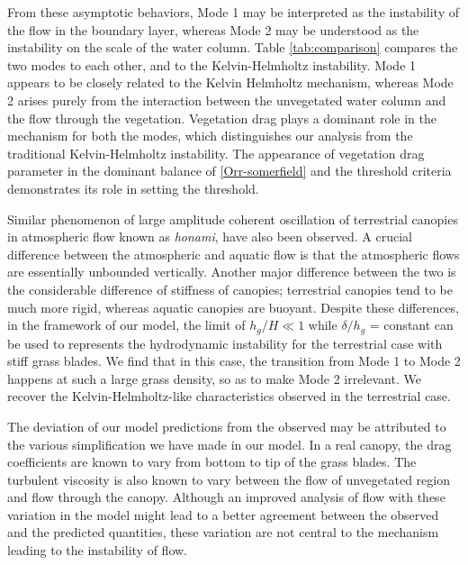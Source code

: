 \documentclass[aps,prl,reprint,twocolumn,showpacs,superscriptaddress,10pt]{revtex4-1}  %
\newcommand{\hg}{h_g}
\begin{document}
From these asymptotic behaviors, Mode 1 may be interpreted as the instability of the flow in the boundary layer, whereas Mode 2 may be understood as the instability on the scale of the water column. 
Table \ref{tab:comparison} compares the two modes to each other, and to the Kelvin-Helmholtz instability. 
Mode 1 appears to be closely related to the Kelvin Helmholtz mechanism, whereas Mode 2 arises purely from the interaction between the unvegetated water column and the flow through the vegetation. 
Vegetation drag plays a dominant role in the mechanism for both the modes, which distinguishes our analysis from the traditional Kelvin-Helmholtz instability. 
The appearance of vegetation drag parameter in the dominant balance of \eqref{Orr-somerfield} and the threshold criteria demonstrates its role in setting the threshold.

Similar phenomenon of large amplitude coherent oscillation of terrestrial canopies in atmospheric flow known as \textit{honami}\cite{Inoue56,Raupach96}, have also been observed.
A crucial difference between the atmospheric and aquatic flow is that the atmospheric flows are essentially unbounded vertically\cite{Vivoni98,Nepf00}. 
Another major difference between the two is the considerable difference of stiffness of canopies; terrestrial canopies tend to be much more rigid, whereas aquatic canopies are buoyant\cite{Vivoni98,Ghisal02}. 
Despite these differences, in the framework of our model, the limit of $\hg/H \ll 1$ while $\delta/\hg$ = constant can be used to represents the hydrodynamic instability for the terrestrial case with stiff grass blades. We find that in this case, the transition from Mode 1 to Mode 2 happens at such a large grass density, so as to make Mode 2 irrelevant. We recover the Kelvin-Helmholtz-like characteristics observed in the terrestrial case. 

The deviation of our model predictions from the observed may be attributed to the various simplification we have made in our model. 
In a real canopy, the drag coefficients are known to vary from bottom to tip of the grass blades\cite{Vivoni98,Nepf00}. 
The turbulent viscosity is also known to vary between the flow of unvegetated region and flow through the canopy\cite{Ghisal02}. 
Although an improved analysis of flow with these variation in the model might lead to a better agreement between the observed and the predicted quantities, these variation are not central to the mechanism leading to the instability of flow.
\end{document}
